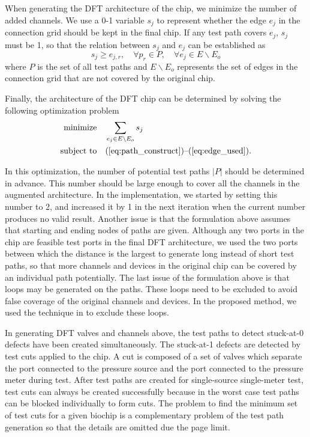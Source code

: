 When generating the DFT architecture of the chip, we minimize the number of
added channels.
We use a 0-1 variable $s_j$ to represent whether the edge $e_j$ in the connection
grid should be kept in the final chip. If any test path covers $e_j$, $s_j$
must be 1, so that the relation between $s_j$ and $e_j$ can be established as
\begin{equation}\label {eq:edge_used} 
  s_j\ge e_{j,r}, \quad \forall p_r\in P, \quad \forall e_j \in E \backslash E_{o}
\end{equation} 
where $P$ is the set of all test paths and $E \backslash E_{o}$ 
represents the set of edges in the connection grid that are not covered by the original
chip.

Finally, the architecture of the DFT chip can be determined by solving the
following optimization problem
\begin{align} \label{eq:DFT_opt_1}
\text{minimize} & \quad \sum_{e_j\in E\backslash E_{o}}s_j\\
\text{subject to} & \quad
\text{(\ref{eq:path_construct})--(\ref{eq:edge_used})}.\label{eq:DFT_opt_2}
\end{align}

In this optimization, the number of potential test paths $|P|$ should be
determined in advance. This number should be large enough to cover all the
channels in the augmented architecture. In the implementation, we started by
setting this number to 2, and increased it by 1 in the next iteration when the current number
produces no valid result. Another issue is that the formulation above assumes
that starting and ending nodes of paths are given. Although any two ports in
the chip are feasible test ports in the final DFT architecture, we used the
two ports between which the distance is the largest to generate long instead
of short test paths, so that more channels and devices in the original chip
can be covered by an individual path potentially. The last issue of the
formulation above is that loops may be generated on the paths. These loops
need to be excluded to avoid false coverage of the original channels and
devices. In the proposed method, we used the technique in
\cite{LLHS17} to exclude these loops.


In generating DFT valves and channels above, the test paths to detect
stuck-at-0 defects have been created simultaneously. The stuck-at-1 defects
are detected by test cuts applied to the chip. A cut is composed of a
set of valves which separate the port connected to the pressure source and the
port connected to the pressure meter during test.  After test paths are
created for single-source single-meter test, test cuts can always be created
successfully because in the worst case test paths can be blocked individually
to form cuts. The problem to find the minimum set of test cuts for a given
biochip is a complementary problem of the test path generation
so that the details are omitted due the page limit.  

